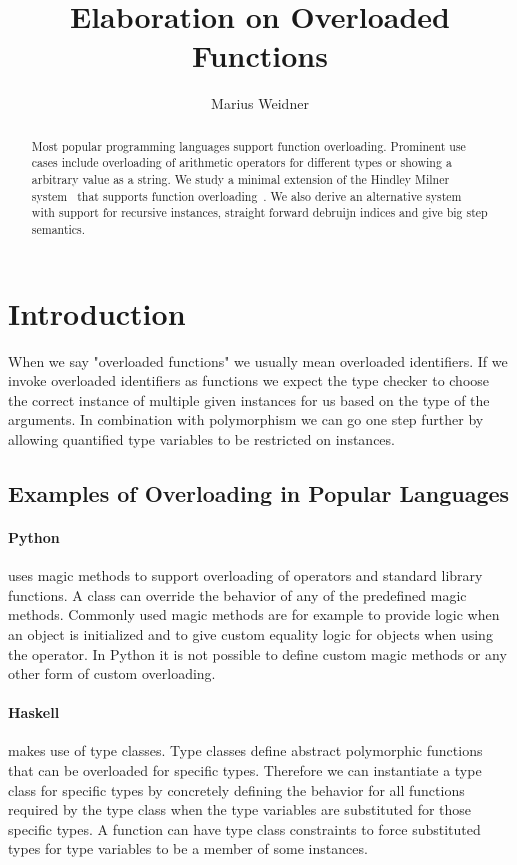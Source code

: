 \documentclass[runningheads]{llncs}
\newcommand{\snip}[1]{\footnotesize{\ttfamily{#1}}}
\begin{document}
\title{Elaboration on Overloaded Functions}
\author{Marius Weidner}
\maketitle

\begin{abstract}
Most popular programming languages support function overloading. Prominent use cases include overloading of arithmetic operators for different types or showing a arbitrary value as a string. We study a minimal extension of the Hindley Milner system~\cite{hindley-milner} that supports function overloading~\cite{system-o}. We also derive an alternative system with support for recursive instances, straight forward debruijn indices and give big step semantics.
\end{abstract}

\section{Introduction}
When we say "overloaded functions" we usually mean overloaded identifiers. If we invoke overloaded identifiers as functions we expect the type checker to choose the correct instance of multiple given instances for us based on the type of the arguments. In combination with polymorphism we can go one step further by allowing quantified type variables to be restricted on instances. 

\subsection{Examples of Overloading in Popular Languages}
\paragraph{Python} uses magic methods to support overloading of operators and standard library functions. A class can override the behavior of any of the predefined magic methods. Commonly used magic methods are for example \snip{\_\_init\_\_(self)} to provide logic when an object is initialized and \snip{\_\_eq\_\_(self, other)} to give custom equality logic for objects when using the \snip{==} operator. In Python it is not possible to define custom magic methods or any other form of custom overloading.
\paragraph{Haskell} makes use of type classes. Type classes define abstract polymorphic functions that can be overloaded for specific types. Therefore we can instantiate a type class for specific types by concretely defining the behavior for all functions required by the type class when the type variables are substituted for those specific types. A function can have type class constraints to force substituted types for type variables to be a member of some instances. 
\end{document}
